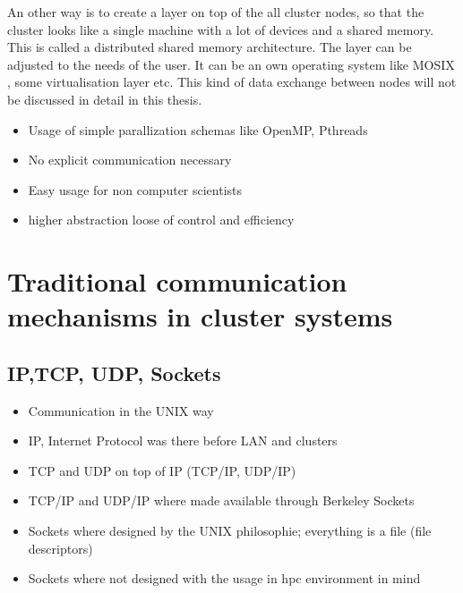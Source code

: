  An
other way is to create a layer on top of the all cluster nodes, so
that the cluster looks like a single machine with a lot of devices and
a shared memory. This is called a distributed shared memory
architecture. The layer can be adjusted to the needs of the user.  It
can be an own operating system like MOSIX \cite{ref:mosix}, some
virtualisation layer \cite{ref:cluster_virt} etc.
This kind of data exchange between nodes will not be discussed in
detail in this thesis.
\begin{itemize}
\item Usage of simple parallization schemas like OpenMP, Pthreads
\item No explicit communication necessary
\item Easy usage for non computer scientists
\item higher abstraction \rightarrow loose of control and efficiency
\end{itemize}


\section{Traditional communication mechanisms in cluster systems}
\label{sec:communication}


\subsection{IP,TCP, UDP, Sockets}
\label{sec:tcp_udp_ip}
\begin{itemize}
  \item Communication in the UNIX way
  \item IP, Internet Protocol was there before LAN and clusters \cite{ref:ip}
  \item TCP and UDP on top of IP (TCP/IP, UDP/IP) \cite{ref:tcp, ref:udp}
  \item TCP/IP and UDP/IP where made available through Berkeley Sockets \cite{ref:sockets}
  \item Sockets where designed by the UNIX philosophie; everything is a file (file descriptors)
  \item Sockets where not designed with the usage in hpc environment in mind
\end{itemize}

